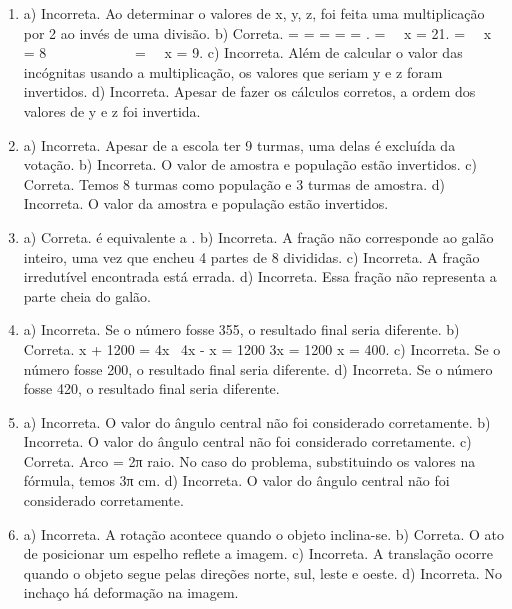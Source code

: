 \begin{enumerate}
\item a) Incorreta. Ao determinar o valores de x, y, z, foi feita uma multiplicação por 2 ao invés de uma divisão.
b) Correta.  =  =  =  =  = .  =  \rightarrow \ \ x = 21.  =  \rightarrow \ \ x = 8\ \ \ \ \ \ \ \ \ \ \ \  =  \rightarrow \ \ x = 9.
c) Incorreta. Além de calcular o valor das incógnitas usando a multiplicação, os valores que seriam y e z foram invertidos.
d) Incorreta. Apesar de fazer os cálculos corretos, a ordem dos valores de y e z foi invertida.

\item a) Incorreta. Apesar de a escola ter 9 turmas, uma delas é excluída da votação.
b) Incorreta. O valor de amostra e população estão invertidos.
c) Correta. Temos 8 turmas como população e 3 turmas de amostra.
d) Incorreta. O valor da amostra e população estão invertidos.


\item a)  Correta.   é equivalente a .
b)  Incorreta. A fração não corresponde ao galão inteiro, uma vez que encheu 4 partes de 8 divididas.
c) Incorreta. A fração irredutível encontrada está errada.
d) Incorreta. Essa fração não representa a parte cheia do galão.


\item a) Incorreta. Se o número fosse 355, o resultado final seria diferente.
b) Correta.
x + 1200 = 4x \rightarrow \ 4x - x = 1200 \rightarrow 3x = 1200 \rightarrow x = 400.
c) Incorreta. Se o número fosse 200, o resultado final seria diferente.
d) Incorreta. Se o número fosse 420, o resultado final seria diferente.

\item a) Incorreta. O valor do ângulo central não foi considerado corretamente.
b) Incorreta. O valor do ângulo central não foi considerado corretamente.
c) Correta. Arco =  \times 2π \times raio.
No caso do problema, substituindo os valores na fórmula, temos 3π cm.
d) Incorreta. O valor do ângulo central não foi considerado corretamente.
\item a) Incorreta. A rotação acontece quando o objeto inclina-se.
b) Correta. O ato de posicionar um espelho reflete a imagem.
c) Incorreta. A translação ocorre quando o objeto segue pelas direções norte, sul, leste e oeste.
d) Incorreta. No inchaço há deformação na imagem.



\end{enumerate}
